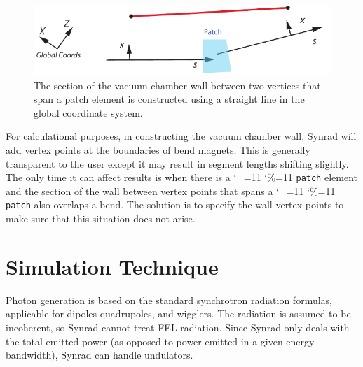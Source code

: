 \documentclass[11pt]{article}
\newcommand\ttcmd{\begingroup\catcode`\_=11 \catcode`\%=11 \dottcmd}
\newcommand\dottcmd[1]{\texttt{#1}\endgroup}
\newcommand{\vn}{\ttcmd}
\begin{document}

  \begin{figure}[tb]
  \begin{center}
  \includegraphics[width=5in]{patch.pdf}
  \caption{
The section of the vacuum chamber wall between two
vertices that span a patch element is constructed using
a straight line in the global coordinate system.
  }
  \label{f:patch}
  \end{center}
  \end{figure}


For calculational purposes, in constructing the vacuum chamber wall,
Synrad will add vertex points at the boundaries of bend magnets. This
is generally transparent to the user except it may result in segment
lengths shifting slightly. The only time it can affect results is when
there is a \vn{patch} element and the section of the wall between
vertex points that spans a \vn{patch} also overlaps a bend. The
solution is to specify the wall vertex points to make sure that this
situation does not arise.

\section{Simulation Technique} 

Photon generation is based on the standard synchrotron radiation
formulas, applicable for dipoles quadrupoles, and wigglers. The
radiation is assumed to be incoherent, so Synrad cannot treat FEL
radiation. Since Synrad only deals with the total emitted power (as
opposed to power emitted in a given energy bandwidth), Synrad can
handle undulators.
\end{document}
